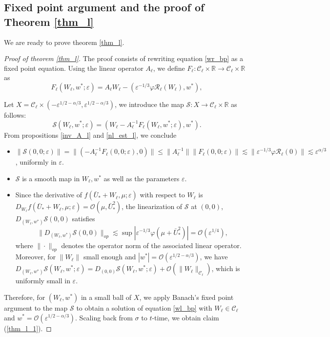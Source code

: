 \documentclass[letterpaper,11pt]{article}
\newcommand{\Ral}{\mathcal{R}}
\newcommand{\rmO}{\mathcal{O}}
\newcommand{\eps}{\varepsilon}
\newcommand{\lar}{ \lesssim }
\numberwithin{equation}{section}
\theoremstyle{plain}
\begin{document}
\subsection{Fixed point argument and the proof of Theorem \ref{thm_l}}
We are ready to prove theorem \ref{thm_l}.
\begin{proof}[Proof of theorem \ref{thm_l}]
The proof consists of rewriting equation \eqref{wr_bp} as a fixed point equation. Using the linear operator $A_\ell$, we define
$F_\ell : \mathcal{C}_\ell \times \mathbb{R} \to \mathcal{C}_\ell \times \mathbb{R}$ as
\[
F_\ell(W_\ell, w^*; \eps) = A_\ell W_\ell - (\eps^{-1/3}\varphi \Ral_\ell(W_\ell), w^*),
\]

Let $X = \mathcal{C}_\ell \times (-\eps^{1/2-\alpha/3},\eps^{1/2-\alpha/3})$, we introduce the map $\mathcal{S}: X \to \mathcal{C}_\ell\times \mathbb{R}$ as follows:
\[
\mathcal{S}(W_\ell,w^*; \eps) = (W_\ell-A_\ell^{-1}F_\ell(W_\ell,w^*;\eps), w^*).
\]
From propositions \ref{inv_A_l} and \ref{nl_est_l}, we conclude 
\begin{itemize}
\item $\|\mathcal{S}(0,0;\eps) \|= \|\left( -A_\ell^{-1}F_\ell(0,0;\eps),0\right)\| \le \|A_\ell^{-1}\|\|F_\ell(0,0;\eps)\| \lar \|\eps^{-1/3}\varphi \Ral_\ell(0)\| \lar \eps^{\alpha/3}$, uniformly in $\eps$.

\item $\mathcal{S}$ is a smooth map in $W_\ell,w^*$ as well as the parameters $\eps$.

\item Since the derivative of $f(\bar{U}_*+W_\ell,\mu;\eps)$ with respect to $W_\ell$ is $D_{W_\ell} f(\bar{U}_*+W_\ell,\mu;\eps)=\rmO(\mu, \bar{U}_*^2)$, the linearization of $\mathcal{S}$ at $(0,0)$, $D_{(W_\ell,w^*)} \mathcal{S}(0,0)$ satisfies
\[
\|D_{(W_\ell,w^*)} \mathcal{S}(0,0)\|_{op} \lar \sup|\eps^{-1/3}\varphi(\mu+\bar{U}_*^2)| = \rmO(\eps^{1/4}),
\]
where $\|\cdot\|_{op}$ denotes the operator norm of the associated linear operator.
Moreover, for $\|W_{\ell}\|$ small enough and $|w^*| =\rmO(\eps^{1/2-\alpha/3})$, we have $D_{(W_\ell,w^*)}\mathcal{S}(W_\ell,w^*;\eps) =  D_{(0, 0)}\mathcal{S}(W_\ell,w^*;\eps)+\rmO(\|W_\ell\|_{\mathcal{C}_\ell})$, which is uniformly small in $\eps$.
\end{itemize}

Therefore, for $(W_\ell, w^*)$ in a small ball of $X$, we apply Banach's fixed point argument to the map $\mathcal{S}$ to obtain a solution of equation \eqref{wl_bp} with $W_\ell \in \mathcal{C}_\ell$ and $w^* = \rmO(\eps^{1/2-\alpha/3})$. Scaling back from $\sigma$ to $t$-time, we obtain claim (\ref{thm_l_1}).
\end{proof}
\end{document}
